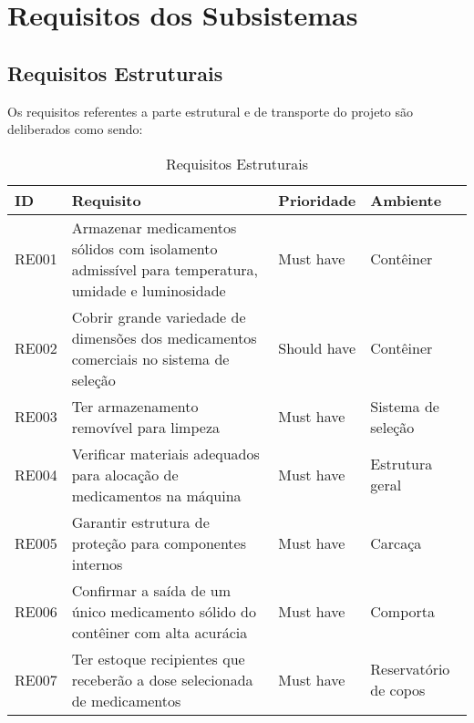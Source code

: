 \section{Requisitos dos Subsistemas}
\subsection{Requisitos Estruturais}

Os requisitos referentes a parte estrutural e de transporte do projeto são deliberados como sendo:

\begin{table}[H]
    \centering
    \caption{Requisitos Estruturais}
	\begin{adjustbox}{max width = \textwidth}
        \begin{tabular}{|L{1.5cm}|L{8.5cm}|C{2.5cm}|C{3.5cm}|}
            \hline
            \textbf{ID} & \textbf{Requisito} & \textbf{Prioridade} & \textbf{Ambiente} \\
            \hline
            RE001 & Armazenar medicamentos sólidos com isolamento admissível para temperatura, umidade e luminosidade & Must have & Contêiner\\ 
            \hline
            
            RE002 & Cobrir grande variedade de dimensões dos medicamentos comerciais no sistema de seleção & Should have & Contêiner \\
            \hline
            
            RE003 & Ter armazenamento removível para limpeza & Must have & Sistema de seleção\\
            \hline
            
            RE004 & Verificar materiais adequados para alocação de medicamentos na máquina & Must have & Estrutura geral\\
            \hline
            
            RE005 &  Garantir estrutura de proteção para componentes internos & Must have & Carcaça\\
            \hline
            
            RE006 & Confirmar a saída de um único medicamento sólido do contêiner com alta acurácia & Must have  & Comporta\\ 
            \hline
            
            RE007 & Ter estoque recipientes que receberão a dose selecionada de medicamentos & Must have & Reservatório de copos\\
            \hline
            

\end{tabular}
\end{adjustbox}
\end{table}
